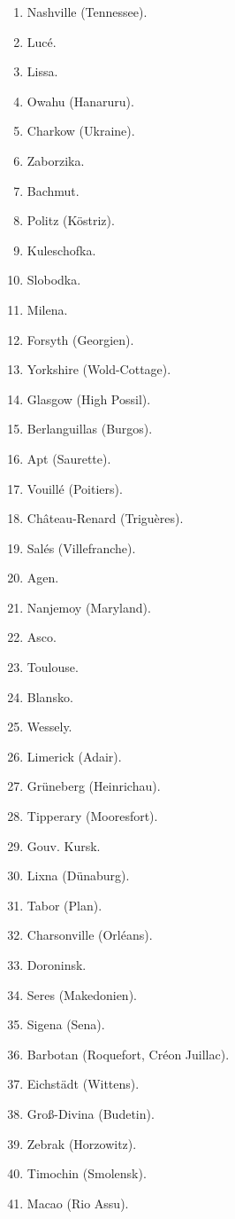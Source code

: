 \documentclass[a4paper, 11pt, oneside, polutonikogreek, german]{article}
\begin{document}
\begin{enumerate}
    \item Nashville (Tennessee).
    \item Lucé.
    \item Lissa.
    \item Owahu (Hanaruru).
    \item Charkow (Ukraine).
    \item Zaborzika.
    \item Bachmut.
    \item Politz (Köstriz).
    \item Kuleschofka.
    \item Slobodka.
    \item Milena.
    \item Forsyth (Georgien).
    \item Yorkshire (Wold-Cottage).
    \item Glasgow (High Possil).
    \item Berlanguillas (Burgos).
    \item Apt (Saurette).
    \item Vouillé (Poitiers).
    \item Château-Renard (Triguères).
    \item Salés (Villefranche).
    \item Agen.
    \item Nanjemoy (Maryland).
    \item Asco.
    \item Toulouse.
    \item Blansko.
    \item Wessely.
    \item Limerick (Adair).
    \item Grüneberg (Heinrichau).
    \item Tipperary (Mooresfort).
    \item Gouv. Kursk.
    \item Lixna (Dünaburg).
    \item Tabor (Plan).
    \item Charsonville (Orléans).
    \item Doroninsk.
    \item Seres (Makedonien).
    \item Sigena (Sena).
    \item Barbotan (Roquefort, Créon Juillac).
    \item Eichstädt (Wittens).
    \item Groß-Divina (Budetin).
    \item Zebrak (Horzowitz).
    \item Timochin (Smolensk).
    \item Macao (Rio Assu).
\end{enumerate}
\end{document}

